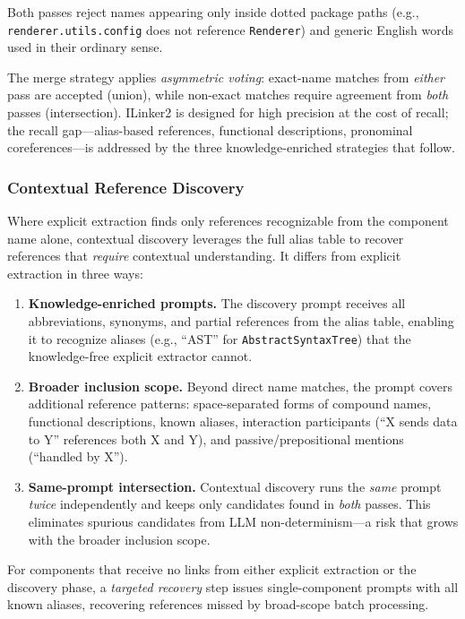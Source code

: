 \noindent Both passes reject names appearing only inside dotted
package paths (e.g., \texttt{renderer.utils.config} does not
reference \texttt{Renderer}) and generic English words used in
their ordinary sense.

The merge strategy applies \emph{asymmetric voting}:
exact-name matches from \emph{either} pass are accepted (union),
while non-exact matches require agreement from \emph{both} passes
(intersection).
ILinker2 is designed for high precision at the cost of recall;
the recall gap---alias-based references, functional descriptions,
pronominal coreferences---is addressed by the three knowledge-enriched
strategies that follow.

\subsubsection{Contextual Reference Discovery}\label{sec:entity}

Where explicit extraction finds only references recognizable from the
component name alone, contextual discovery leverages the full alias
table to recover references that \emph{require} contextual
understanding.
It differs from explicit extraction in three ways:

\begin{enumerate}
    \item \textbf{Knowledge-enriched prompts.}
      The discovery prompt receives all abbreviations, synonyms, and
      partial references from the alias table, enabling it to
      recognize aliases (e.g., ``AST'' for \texttt{AbstractSyntaxTree})
      that the knowledge-free explicit extractor cannot.
    \item \textbf{Broader inclusion scope.}
      Beyond direct name matches, the prompt covers additional
      reference patterns: space-separated forms of compound names,
      functional descriptions, known aliases, interaction participants
      (``X sends data to Y'' references both X and Y), and
      passive/prepositional mentions (``handled by X'').
    \item \textbf{Same-prompt intersection.}
      Contextual discovery runs the \emph{same} prompt \emph{twice}
      independently and keeps only candidates found in \emph{both}
      passes.
      This eliminates spurious candidates from LLM non-determinism---a
      risk that grows with the broader inclusion scope.
\end{enumerate}

For components that receive no links from either explicit extraction
or the discovery phase, a \emph{targeted recovery} step issues
single-component prompts with all known aliases, recovering references
missed by broad-scope batch processing.

